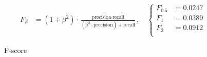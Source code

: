 \begin{figure}
    \centering
    \begin{align*}
        F_\beta &= (1+\beta^2) \cdot \frac{\text{precision} \cdot \text{recall}}{(\beta^2\cdot\text{precision}) + \text{recall}},\quad
        \begin{cases} 
        F_{0.5} &= 0.0247\\ 
        F_1     &= 0.0389\\ 
        F_2     &= 0.0912\\ 
        \end{cases}
    \end{align*}
    \caption[\project's F-score]{F-score}
    \label{fig:f_score}
\end{figure}